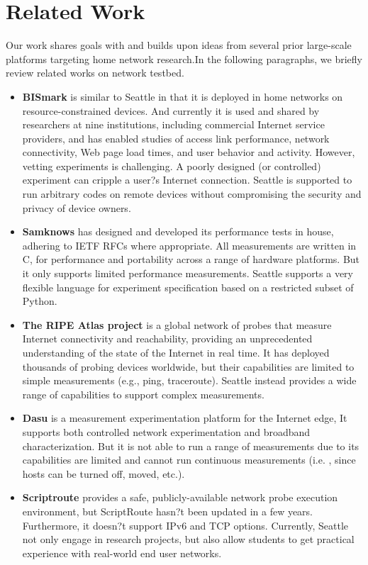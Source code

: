 \documentclass[11pt, oneside]{article}   	%
\begin{document}
\section{Related Work}
\label{sec.related_work}
Our work shares goals with and builds upon ideas from several prior large-scale platforms targeting home network research.In the following paragraphs, we briefly review related works on network testbed. 
\begin{itemize}
\item \textbf{BISmark} is similar to Seattle in that it is deployed in home networks on resource-constrained devices. And currently it is used and shared by researchers at nine institutions, including commercial Internet service providers, and has enabled studies of access link performance, network connectivity, Web page load times, and user behavior and activity. However, vetting experiments is challenging. A poorly designed (or controlled) experiment can cripple a user?s Internet connection. Seattle is supported to run arbitrary codes on remote devices without compromising the security and privacy of device owners.
\item \textbf{Samknows} has designed and developed its performance tests in house, adhering to IETF RFCs where appropriate. All measurements are written in C, for performance and portability across a range of hardware platforms. But it only supports limited performance measurements. Seattle supports a very flexible language for experiment specification based on a restricted subset of Python.
\item \textbf{The RIPE Atlas project} is a global network of probes that measure Internet connectivity and reachability, providing an unprecedented understanding of the state of the Internet in real time. It has deployed thousands of probing devices worldwide, but their capabilities are limited to simple measurements (e.g., ping, traceroute). Seattle instead provides a wide range of capabilities to support complex measurements. 
\item \textbf{Dasu} is a measurement experimentation platform for the Internet edge, It supports both controlled network experimentation and broadband characterization. But it is not able to run a range of  measurements due to its capabilities are limited and cannot run continuous measurements (i.e. , since hosts can be turned off, moved, etc.).
\item \textbf{Scriptroute} provides a safe, publicly-available network probe execution environment, but ScriptRoute hasn?t been updated in a few years. Furthermore, it doesn?t support IPv6 and TCP options. Currently, Seattle not only engage in research projects, but also  allow students to get practical experience with real-world end user networks.


\end{itemize}
\end{document}
